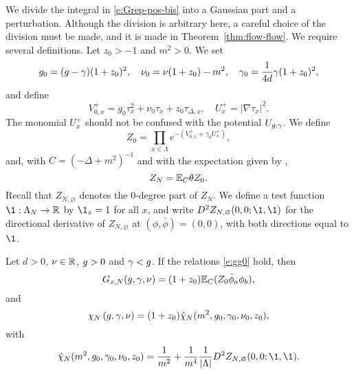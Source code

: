 We divide
the integral in \eqref{e:Grep-pos-bis} into
a Gaussian part and a perturbation.  Although the division is arbitrary here,
a careful choice of the division must be made, and it is made in Theorem~\ref{thm:flow-flow}.
We require several definitions.
Let $z_0>-1$ and $m^2 >0$. We set
\begin{equation}
\label{e:gg0}
g_0 = (g - \gamma) (1 + z_0)^2,
\quad
\nu_0 = \nu (1 + z_0) - m^2,
\quad
\gamma_0 = \frac{1}{4d} \gamma (1 + z_0)^2,
\end{equation}
and define
\begin{equation}
\label{e:V0def}
  V^+_{0,x}
  = g_0\tau_x^2 + \nu_0 \tau_x + z_0 \tau_{\Delta,x},
  \quad
  U^+_x = |\nabla \tau_x|^2.
\end{equation}
The monomial $U^+_x$ should not be confused with
the potential $U_{g,\gamma}$.
We define
\begin{equation}
\label{e:Z0def}
  Z_0
  =
  \prod_{x\in \Lambda} e^{-(V^+_{0,x} + \gamma_0 U^+_x)},
\end{equation}
and, with $C = (-\Delta + m^2)^{-1}$ and with the expectation given by ,
\begin{equation}
\label{e:ZNdef}
Z_N = \mathbb{E}_C \theta Z_0.
\end{equation}
Recall that $Z_{N,\varnothing}$ denotes the $0$-degree part of $Z_N$.
We define a test function $\1: \Lambda_N \to \R$ by $\1_x=1$ for all $x$,
and write $D^2 Z_{N,\varnothing}(0, 0; \1, \1)$ for the directional derivative of
$Z_{N,\varnothing}$
at $(\phi, \bar\phi) = (0, 0)$, with both directions equal to $\1$.

\begin{prop}
Let $d > 0$, $\nu \in {\mathbb R}$, $g >0$ and $\gamma <g$.
If the relations \eqref{e:gg0} hold, then
\label{prop:intrep}
\begin{equation}
\label{e:GG2}
G_{x,N}(g, \gamma, \nu)
    =
(1+z_0)
\mathbb{E}_C (Z_0 \bar\phi_a \phi_b),
\end{equation}
and
\begin{equation}
\label{e:chichibar}
  \chi_N\left(g,\gamma,\nu\right)
  = (1+z_0)\hat\chi_N(m^2, g_0, \gamma_0, \nu_0, z_0)
  ,
\end{equation}
with
\begin{equation}
  \label{e:chibarm}
  \hat\chi_N(m^2, g_0, \gamma_0, \nu_0, z_0)
  = \frac{1}{m^2}  + \frac{1}{m^4} \frac{1}{|\Lambda|} D^2 Z_{N,\varnothing}(0, 0; \1, \1).
\end{equation}
\end{prop}

